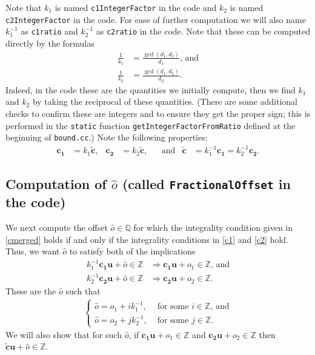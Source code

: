 \documentclass[11pt]{article}
\newcommand{\vect}[1]{\mathbf{#1}}
\begin{document}
Note that $k_1$ is named \texttt{c1IntegerFactor} in the code and $k_2$ is named \texttt{c2IntegerFactor} in the code. For ease of further computation we will also name $k_1^{-1}$ as \texttt{c1ratio} and $k_2^{-1}$ as \texttt{c2ratio} in the code. Note that these can be computed directly by the formulas
\begin{align*}
\frac{1}{k_1} &= \frac{\gcd(d_1,d_2)}{d_1}\text{, and} \\
\frac{1}{k_2} &= \frac{\gcd(d_1,d_2)}{d_2}.
\end{align*}
Indeed, in the code these are the quantities we initially compute, then we find $k_1$ and $k_2$ by taking the reciprocal of these quantities. (There are some additional checks to confirm these are integers and to ensure they get the proper sign; this is performed in the \texttt{static} function \texttt{getIntegerFactorFromRatio} defined at the beginning of \texttt{bound.cc}.)
Note the following properties:
\begin{align}
\vect{c_1} &= k_1 \widetilde{\vect{c}}, & \vect{c_2} &= k_2\widetilde{\vect{c}}, & & \text{and} & \widetilde{\vect{c}} &= k_1^{-1} \vect{c_1} = k_2^{-1} \vect{c_2}. \label{k-props}
\end{align}

\subsection{Computation of $\widehat{o}$ (called \texttt{FractionalOffset} in the code)}

We next compute the offset $\widehat{o}\in\mathbb{Q}$ for which the integrality condition given in \eqref{cmerged} holds if and only if the integrality conditions in \eqref{c1} and \eqref{c2} hold. Thus, we want $\widehat{o}$ to satisfy both of the implications
\begin{align*}
k_1^{-1}\vect{c_1}\vect{u} + \widehat{o} \in \mathbb{Z} &\Rightarrow \vect{c_1}\vect{u} + o_1 \in \mathbb{Z}\text{, and} \\
k_2^{-1}\vect{c_2}\vect{u} + \widehat{o} \in \mathbb{Z} &\Rightarrow \vect{c_2}\vect{u} + o_2 \in \mathbb{Z}.
\end{align*}
These are the $\widehat{o}$ such that
\begin{align}
\begin{cases}
\widehat{o} = o_1 + ik_1^{-1}, & \text{ for some $i\in\mathbb{Z}$, and} \\
\widehat{o} = o_2 + jk_2^{-1}, & \text{ for some $j\in\mathbb{Z}$.}
\end{cases} \label{o-hat-criteria}
\end{align}
We will also show that for such $\widehat{o}$, if $\vect{c_1}\vect{u} + o_1 \in \mathbb{Z}$ and $\vect{c_2}\vect{u} + o_2\in\mathbb{Z}$ then $\widetilde{\vect{c}}\vect{u} + \widehat{o} \in\mathbb{Z}$.
\end{document}
